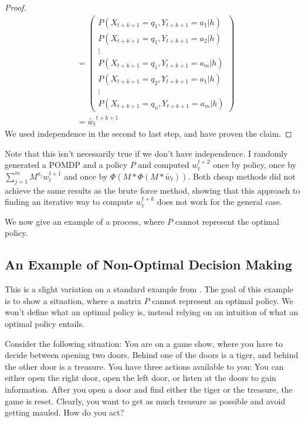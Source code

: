 \documentclass{article}
\theoremstyle{definition}
\begin{document}
\begin{proof}
\begin{align*}
&=
\left (
\begin{matrix}
P(X_{t+k+1}=q_1,Y_{t+k+1}=a_1|h) \\
P(X_{t+k+1}=q_1,Y_{t+k+1}=a_2|h) \\ 
\vdots \\
P(X_{t+k+1}=q_1,Y_{t+k+1}=a_m|h) \\ 
P(X_{t+k+1}=q_2,Y_{t+k+1}=a_1|h) \\ 
\vdots \\
P(X_{t+k+1}=q_n,Y_{t+k+1}=a_m|h)
\end{matrix}
\right ) \\ 
&=\widetilde{w_t}^{t+k+1}
\end{align*}
We used independence in the second to last step, and have proven the claim.
\end{proof}

Note that this isn't necessarily true if we don't have independence. I randomly generated a POMDP and a policy $P$ and computed $w_t^{t+2}$ once by policy, once by $\sum\limits_{j=1}^{m} M^{a_j}w_t^{t+1}$ and once by $\Phi(M*\Phi(M*\widetilde{w_t}))$. Both cheap methods did not achieve the same results as the brute force method, showing that this approach to finding an iterative way to compute $w_t^{t+k}$ does not work for the general case.  

We now give an example of a process, where $P$ cannot represent the optimal policy.
\subsection{An Example of Non-Optimal Decision Making}

\label{Tigers}
This is a slight variation on a standard example from \cite{Kae4}. The goal of this example is to show a situation, where a matrix $P$ cannot represent an optimal policy. We won't define what an optimal policy is, instead relying on an intuition of what an optimal policy entails.

Consider the following situation: You are on a game show, where you have to decide between opening two doors. Behind one of the doors is a tiger, and behind the other door is a treasure. You have three actions available to you: You can either open the right door, open the left door, or listen at the doors to gain information.
 After you open a door and find either the tiger or the treasure, the game is reset. Clearly, you want to get as much treasure as possible and avoid getting mauled. How do you act?
\end{document}
